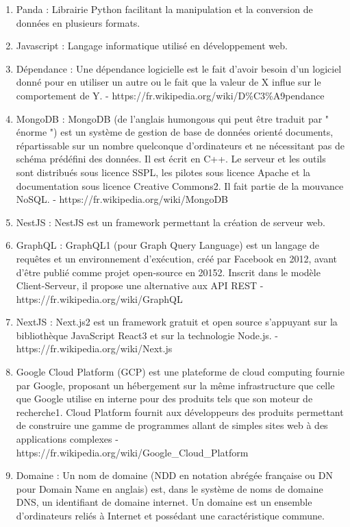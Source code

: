 \documentclass[12pt]{article}
\begin{document}
\begin {sloppypar}
\begin{enumerate}
  \item 
    Panda : Librairie Python facilitant la manipulation et la conversion de données en plusieurs formats. 
  \item 
    Javascript : Langage informatique utilisé en développement web. 
  \item 
    Dépendance : Une dépendance logicielle est le fait d'avoir besoin d'un logiciel donné pour en utiliser un autre ou le fait que la valeur de X influe sur le comportement de Y. 
    - https://fr.wikipedia.org/wiki/D\%C3\%A9pendance
  \item 
    MongoDB : MongoDB (de l'anglais humongous qui peut être traduit par " énorme ") est un système de gestion de base de données orienté documents, répartissable sur un nombre quelconque d'ordinateurs et ne nécessitant pas de schéma prédéfini des données. Il est écrit en C++. Le serveur et les outils sont distribués sous licence SSPL, les pilotes sous licence Apache et la documentation sous licence Creative Commons2. Il fait partie de la mouvance NoSQL. 
    - https://fr.wikipedia.org/wiki/MongoDB
  \item 
    NestJS : NestJS est un framework permettant la création de serveur web.
  \item 
    GraphQL : GraphQL1 (pour Graph Query Language) est un langage de requêtes et un environnement d'exécution, créé par Facebook en 2012, avant d'être publié comme projet open-source en 20152. Inscrit dans le modèle Client-Serveur, il propose une alternative aux API REST
    - https://fr.wikipedia.org/wiki/GraphQL
  \item 
    NextJS : Next.js2 est un framework gratuit et open source s'appuyant sur la bibliothèque JavaScript React3 et sur la technologie Node.js. 
    - https://fr.wikipedia.org/wiki/Next.js
  \item 
    Google Cloud Platform (GCP) est une plateforme de cloud computing fournie par Google, proposant un hébergement sur la même infrastructure que celle que Google utilise en interne pour des produits tels que son moteur de recherche1. Cloud Platform fournit aux développeurs des produits permettant de construire une gamme de programmes allant de simples sites web à des applications complexes
    - https://fr.wikipedia.org/wiki/Google\_Cloud\_Platform
  \item 
    Domaine : Un nom de domaine (NDD en notation abrégée française ou DN pour Domain Name en anglais) est, dans le système de noms de domaine DNS, un identifiant de domaine internet. Un domaine est un ensemble d'ordinateurs reliés à Internet et possédant une caractéristique commune. 

\end{enumerate}
\end{sloppypar}
\end{document}
